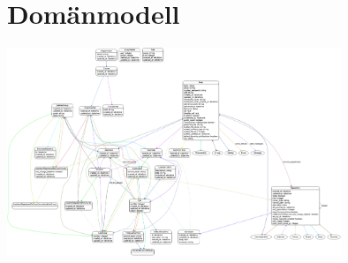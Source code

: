 \chapter{Domänmodell}
\label{appendix:er-diagram}
\centering
\begin{landscape}
\includegraphics[width=10.0cm]{fig/database/e-r-diagram.pdf}
\end{landscape}
